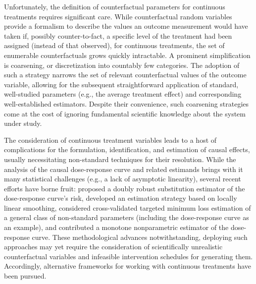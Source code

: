 Unfortunately, the definition of counterfactual parameters for continuous
treatments requires significant care. While counterfactual random variables
provide a formalism to describe the values an outcome measurement would have
taken if, possibly counter-to-fact, a specific level of the treatment had been
assigned (instead of that observed), for continuous treatments, the set of
enumerable counterfactuals grows quickly intractable. A prominent
simplification is coarsening, or discretization into countably few categories.
The adoption of such a strategy narrows the set of relevant counterfactual
values of the outcome variable, allowing for the subsequent straightforward
application of standard, well-studied parameters (e.g., the average treatment
effect) and corresponding well-established estimators. Despite their
convenience, such coarsening strategies come at the cost of ignoring fundamental
scientific knowledge about the system under study.

The consideration of continuous treatment variables leads to a host of
complications for the formulation, identification, and estimation of causal
effects, usually necessitating non-standard techniques for their resolution.
While the analysis of the causal dose-response curve and related estimands
brings with it many statistical challenges (e.g., a lack of asymptotic
linearity), several recent efforts have borne fruit: \citet{diaz2013targeted}
proposed a doubly robust substitution estimator of the dose-response curve's
risk, \citet{kennedy2017nonparametric} developed an estimation strategy based on
locally linear smoothing, \citet{vdl2018cvtmle} considered cross-validated
targeted minimum loss estimation of a general class of non-standard parameters
(including the dose-response curve as an example), and
\citet{westling2020causal} contributed a monotone nonparametric estimator of the
dose-response curve. These methodological advances notwithstanding, deploying
such approaches may yet require the consideration of scientifically unrealistic
counterfactual variables and infeasible intervention schedules for generating
them. Accordingly, alternative frameworks for working with continuous
treatments have been pursued.

